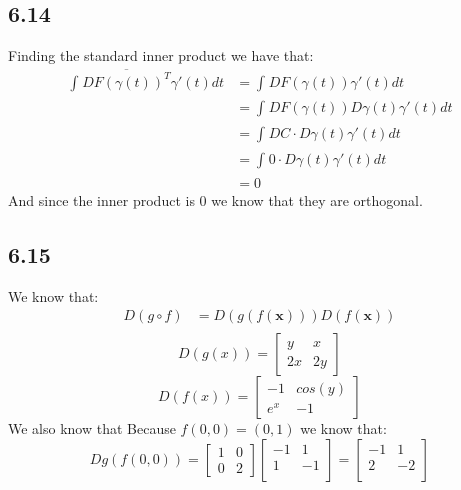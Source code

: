 \documentclass[letterpaper,12pt]{article}
\theoremstyle{definition}
\begin{document}
\subsection*{6.14}
Finding the standard inner product we have that:
\begin{align*}
    \int^{}_{}\overline {DF(\gamma(t))^T} \gamma'(t) dt &=  \int^{}_{}DF(\gamma(t)) \gamma'(t) dt \\
    &=  \int^{}_{}DF(\gamma(t))D\gamma(t) \gamma'(t) dt \\
    &=  \int^{}_{}DC\cdot D\gamma(t) \gamma'(t) dt \\
    &=  \int^{}_{}0\cdot D\gamma(t) \gamma'(t) dt \\
    &=  0
\end{align*}
And since the inner product is $0$ we know that they are orthogonal. 



\subsection*{6.15}
We know that:
\begin{align*}
D(g \circ f)&=D(g(f(\textbf{x})))D(f(\textbf{x}))\\
\end{align*}
\[D(g(x)) = \begin{bmatrix} y & x\\ 2x& 2y \end{bmatrix}\]
\[D(f(x)) = \begin{bmatrix} -1 & cos(y) \\ e^x& -1 \end{bmatrix}\]
    We also know that
    Because $f(0,0) = (0,1)$ we know that:
\[Dg(f(0,0)) = \begin{bmatrix} 1&0\\0&2\end{bmatrix} \begin{bmatrix}-1 & 1 \\
                1 & -1 \\
\end{bmatrix}
= \begin{bmatrix}-1 & 1 \\
                2 & -2 \\
\end{bmatrix}\]
\end{document}
